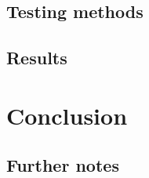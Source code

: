 \documentclass[11pt,a4paper]{vutinfth}
\begin{document}
\section{Testing methods}

\section{Results}

\chapter{Conclusion}

\section{Further notes}





\backmatter %



\end{document}
